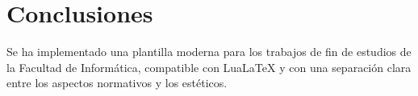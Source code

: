 \chapter{Conclusiones}

Se ha implementado una plantilla moderna para los trabajos de
fin de estudios de la Facultad de Informática, compatible con
LuaLaTeX y con una separación clara entre los aspectos
normativos y los estéticos.
